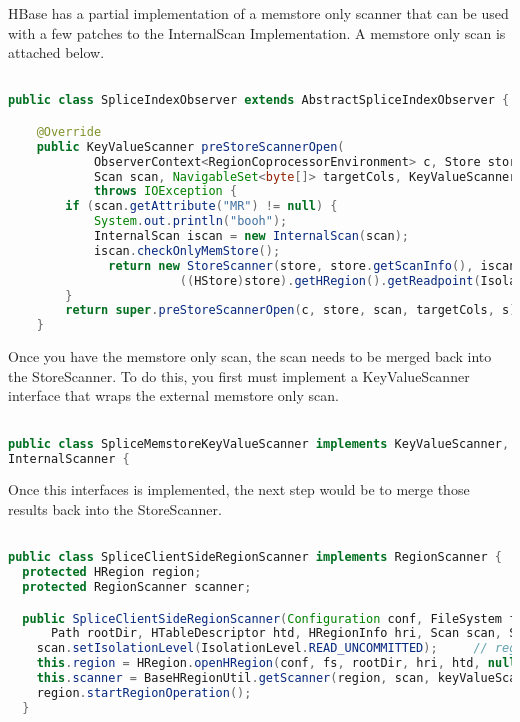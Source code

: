 HBase has a partial implementation of a memstore only scanner that can be used
with a few patches to the InternalScan Implementation.  A memstore only scan is
attached below.

\begin{lstlisting}[language=java]

public class SpliceIndexObserver extends AbstractSpliceIndexObserver {

	@Override
	public KeyValueScanner preStoreScannerOpen(
			ObserverContext<RegionCoprocessorEnvironment> c, Store store,
			Scan scan, NavigableSet<byte[]> targetCols, KeyValueScanner s)
			throws IOException {
		if (scan.getAttribute("MR") != null) {
			System.out.println("booh");
			InternalScan iscan = new InternalScan(scan);
			iscan.checkOnlyMemStore();
		      return new StoreScanner(store, store.getScanInfo(), iscan, targetCols,
		    	        ((HStore)store).getHRegion().getReadpoint(IsolationLevel.READ_UNCOMMITTED));		
		} 
		return super.preStoreScannerOpen(c, store, scan, targetCols, s);
	}
\end{lstlisting}

Once you have the memstore only scan, the scan needs to be merged back into the
StoreScanner.  To do this, you first must implement a KeyValueScanner interface
that wraps the external memstore only scan.

\begin{lstlisting}[language=java]

public class SpliceMemstoreKeyValueScanner implements KeyValueScanner,
InternalScanner {
\end{lstlisting}

Once this interfaces is implemented, the next step would be to merge those
results back into the StoreScanner.

\begin{lstlisting}[language=java]

public class SpliceClientSideRegionScanner implements RegionScanner {
  protected HRegion region;
  protected RegionScanner scanner;

  public SpliceClientSideRegionScanner(Configuration conf, FileSystem fs,
      Path rootDir, HTableDescriptor htd, HRegionInfo hri, Scan scan, ScanMetrics scanMetrics, List<KeyValueScanner> keyValueScanners) throws IOException {
    scan.setIsolationLevel(IsolationLevel.READ_UNCOMMITTED);     // region is immutable, set isolation level
    this.region = HRegion.openHRegion(conf, fs, rootDir, hri, htd, null, null, null);
    this.scanner = BaseHRegionUtil.getScanner(region, scan, keyValueScanners);
    region.startRegionOperation();
  }

\end{lstlisting}

